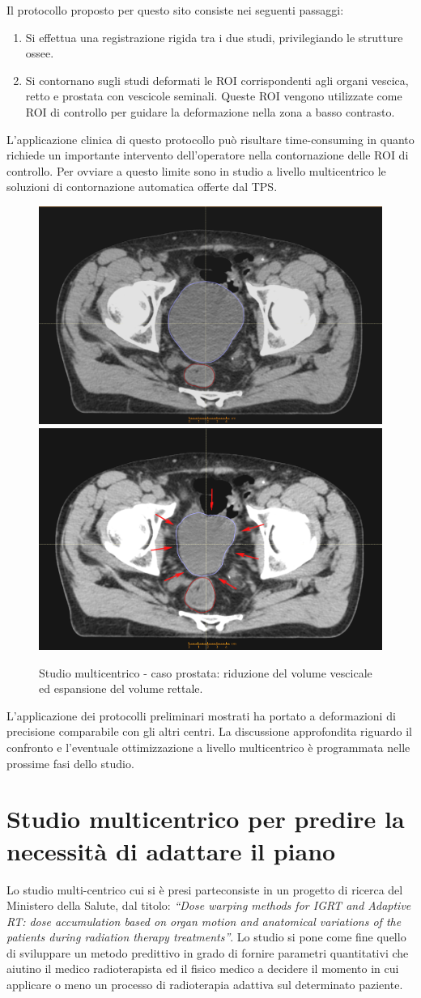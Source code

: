 Il protocollo proposto per questo sito consiste nei seguenti passaggi:
\begin{enumerate}
\item Si effettua una registrazione rigida tra i due studi, privilegiando le strutture ossee.
\item Si contornano sugli studi deformati le ROI corrispondenti agli organi vescica, retto e prostata con vescicole seminali. Queste ROI vengono utilizzate come ROI di controllo per guidare la deformazione nella zona a basso contrasto.
\end{enumerate}
L'applicazione clinica di questo protocollo può risultare time-consuming in quanto richiede un importante intervento dell'operatore nella contornazione delle ROI di controllo. Per ovviare a questo limite sono in studio a livello multicentrico le soluzioni di contornazione automatica offerte dal TPS.

\begin{figure}
\centering
\includegraphics[width=.48\textwidth]{./cap3/YES_PR.png}
\includegraphics[width=.48\textwidth]{./cap3/YES_PR_shrink.png}
\caption{Studio multicentrico - caso prostata: riduzione del volume vescicale ed espansione del volume rettale.}
\label{fig:YES_PR}
\end{figure}


L'applicazione dei protocolli preliminari mostrati ha portato a deformazioni di precisione comparabile con gli altri centri. La discussione approfondita riguardo il confronto e l'eventuale ottimizzazione a livello multicentrico è programmata nelle prossime fasi dello studio.


\section{Studio multicentrico per predire la necessità di adattare il piano}
Lo studio multi-centrico cui si è presi parteconsiste in un progetto di ricerca del Ministero della Salute, dal titolo: \textit{``Dose warping methods for IGRT and Adaptive RT: dose accumulation based on organ motion and anatomical variations of the patients during radiation therapy treatments''}. Lo studio si pone come fine quello di sviluppare un metodo predittivo in grado di fornire parametri quantitativi che aiutino il medico radioterapista ed il fisico medico a decidere il momento in cui applicare o meno un processo di radioterapia adattiva sul determinato paziente.

